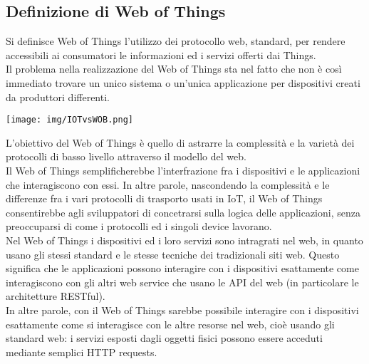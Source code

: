 \documentclass{article}
\begin{document}
\subsection{Definizione di Web of Things}
Si definisce Web of Things l'utilizzo dei protocollo web, standard, per rendere accessibili ai consumatori le informazioni ed i servizi offerti dai Things. \\
Il problema nella realizzazione del Web of Things sta nel fatto che non è così immediato trovare un unico sistema o un'unica applicazione per dispositivi creati da produttori differenti.
\begin{center}
\texttt{[image: img/IOTvsWOB.png]}\\
\end{center}
L'obiettivo del Web of Things è quello di astrarre la complessità e la varietà dei protocolli di basso livello attraverso il modello del web. \\
Il Web of Things semplificherebbe l'interfrazione fra i dispositivi e le applicazioni che interagiscono con essi. In altre parole, nascondendo la complessità e le differenze fra i vari protocolli di trasporto usati in IoT, il Web of Things consentirebbe agli sviluppatori di concetrarsi sulla logica delle applicazioni, senza preoccuparsi di come i protocolli ed i singoli device lavorano. \\
Nel Web of Things i dispositivi ed i loro servizi sono intragrati nel web, in quanto usano gli stessi standard e le stesse tecniche dei tradizionali siti web. Questo significa che le applicazioni possono interagire con i dispositivi esattamente come interagiscono con gli altri web service che usano le API del web (in particolare le architetture RESTful). \\
In altre parole, con il Web of Things sarebbe possibile interagire con i dispositivi esattamente come si interagisce con le altre resorse nel web, cioè usando gli standard web: i servizi esposti dagli oggetti fisici possono essere acceduti mediante semplici HTTP requests.
\end{document}

